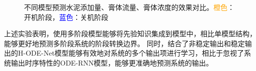 \begin{figure}
\caption{不同模型预测水泥添加量、膏体流量、膏体浓度的效果对比。\textcolor{orange}{橙色}：开机阶段，\textcolor{blue}{蓝色}：关机阶段} %
\label{fig:4_paste_models}  %
\end{figure}
上述实验表明，使用多阶段模型能够将先验知识集成到模型中，相比单模型结构，能够更好地预测多阶段系统的阶段转换边界。
同时，结合了非稳定输出和稳定输出的H-ODE-Net模型能够有效地对系统的多个输出项进行学习，相比于忽视了系统输出时序特性的ODE-RNN模型，能够更准确地预测系统的输出。

